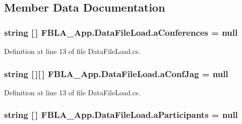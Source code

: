\subsection{Member Data Documentation}
\hypertarget{class_f_b_l_a___app_1_1_data_file_load_a3d495ef31a25b1f1eb472ecab72a3232}{
\subsubsection[{a\+Conferences}]{\setlength{\rightskip}{0pt plus 5cm}string \mbox{[}$\,$\mbox{]} F\+B\+L\+A\+\_\+\+App.\+Data\+File\+Load.\+a\+Conferences = null}}\label{class_f_b_l_a___app_1_1_data_file_load_a3d495ef31a25b1f1eb472ecab72a3232}


Definition at line 13 of file Data\+File\+Load.\+cs.

\hypertarget{class_f_b_l_a___app_1_1_data_file_load_a276ea819860ce1e04242a5a4f909d429}{
\subsubsection[{a\+Conf\+Jag}]{\setlength{\rightskip}{0pt plus 5cm}string \mbox{[}$\,$\mbox{]}\mbox{[}$\,$\mbox{]} F\+B\+L\+A\+\_\+\+App.\+Data\+File\+Load.\+a\+Conf\+Jag = null}}\label{class_f_b_l_a___app_1_1_data_file_load_a276ea819860ce1e04242a5a4f909d429}


Definition at line 13 of file Data\+File\+Load.\+cs.

\hypertarget{class_f_b_l_a___app_1_1_data_file_load_aa834ccb3df879a0242cc5d572dad190c}{
\subsubsection[{a\+Participants}]{\setlength{\rightskip}{0pt plus 5cm}string \mbox{[}$\,$\mbox{]} F\+B\+L\+A\+\_\+\+App.\+Data\+File\+Load.\+a\+Participants = null}}\label{class_f_b_l_a___app_1_1_data_file_load_aa834ccb3df879a0242cc5d572dad190c}


